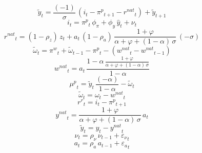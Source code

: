 \begin{dmath}
{{\tilde y}}_{t}=\frac{\left(-1\right)}{{{\sigma}}}\, \left({{i}}_{t}-{{\pi^p}}_{t+1}-{{r^{nat}}}_{t}\right)+{{\tilde y}}_{t+1}
\end{dmath}
\begin{dmath}
{{i}}_{t}={{\pi^p}}_{t}\, {{\phi_{\pi}}}+{{\phi_{y}}}\, {{\hat y}}_{t}+{{\nu}}_{t}
\end{dmath}
\begin{dmath}
{{r^{nat}}}_{t}=\left(1-{{\rho_{z}}}\right)\, {{z}}_{t}+{{a}}_{t}\, \left(1-{{\rho_a}}\right)\, \frac{1+{{\varphi}}}{{{\alpha}}+{{\varphi}}+\left(1-{{\alpha}}\right)\, {{\sigma}}}\, \left(-{{\sigma}}\right)
\end{dmath}
\begin{dmath}
{{\tilde \omega}}_{t}={{\pi^w}}_{t}+{{\tilde \omega}}_{t-1}-{{\pi^p}}_{t}-\left({{w^{nat}}}_{t}-{{w^{nat}}}_{t-1}\right)
\end{dmath}
\begin{dmath}
{{w^{nat}}}_{t}={{a}}_{t}\, \frac{1-{{\alpha}}\, \frac{1+{{\varphi}}}{{{\alpha}}+{{\varphi}}+\left(1-{{\alpha}}\right)\, {{\sigma}}}}{1-{{\alpha}}}
\end{dmath}
\begin{dmath}
{{\mu^p}}_{t}={{\tilde y}}_{t}\, \frac{\left(-{{\alpha}}\right)}{1-{{\alpha}}}-{{\tilde \omega}}_{t}
\end{dmath}
\begin{dmath}
{{\tilde \omega}}_{t}={\omega}_{t}-{{w^{nat}}}_{t}
\end{dmath}
\begin{dmath}
{{r^r}}_{t}={{i}}_{t}-{{\pi^p}}_{t+1}
\end{dmath}
\begin{dmath}
{{y^{nat}}}_{t}=\frac{1+{{\varphi}}}{{{\alpha}}+{{\varphi}}+\left(1-{{\alpha}}\right)\, {{\sigma}}}\, {{a}}_{t}
\end{dmath}
\begin{dmath}
{{\tilde y}}_{t}={{y}}_{t}-{{y^{nat}}}_{t}
\end{dmath}
\begin{dmath}
{{\nu}}_{t}={{\rho_{\nu}}}\, {{\nu}}_{t-1}+{{\varepsilon_\nu}}_{t}
\end{dmath}
\begin{dmath}
{{a}}_{t}={{\rho_a}}\, {{a}}_{t-1}+{{\varepsilon_a}}_{t}
\end{dmath}
